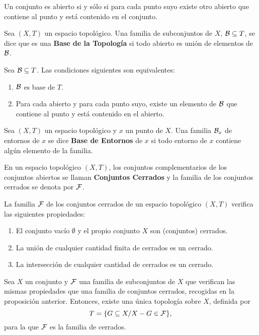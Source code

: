 \documentclass[cursovd_portada.tex]{subfiles}
\begin{document}
\begin{prop}
Un conjunto es abierto si y sólo si para cada punto suyo existe otro abierto que contiene al punto y está
contenido en el conjunto.
\end{prop}
\begin{defi}
Sea $(X,T)$ un espacio topológico. Una familia de subconjuntos de $X$, ${\cal B}\subseteq T$, se dice que es una
{\bf Base de la Topología} si todo abierto es unión de elementos de ${\cal B}$.
\end{defi}
\begin{teorema}
Sea ${\cal B}\subseteq T$. Las condiciones siguientes son equivalentes:
\begin{enumerate}
\item ${\cal B}$ es base de $T$.
\item Para cada abierto y para cada punto suyo, existe un elemento de ${\cal B}$ que contiene al punto y está
contenido en el abierto.
\end{enumerate}
\end{teorema}
\begin{defi}
Sea $(X,T)$ un espacio topológico y $x$ un punto de $X$. Una familia ${\cal B}_x$ de entornos de $x$ se dice {\bf
Base de Entornos} de $x$ si todo entorno de $x$ contiene algún elemento de la familia.
\end{defi}
\begin{defi}
En un espacio topológico $(X,T)$, los conjuntos complementarios de los conjuntos abiertos se llaman {\bf Conjuntos
Cerrados} y la familia de los conjuntos cerrados se denota por ${\cal F}$.
\end{defi}
\begin{prop}
La familia ${\cal F}$ de los conjuntos cerrados de un espacio to\-po\-ló\-gi\-co $(X,T)$ verifica las siguientes
propiedades:
\begin{enumerate}
\item El conjunto vacío $\emptyset$ y el propio conjunto $X$ son (conjuntos) cerrados.
\item La unión de cualquier cantidad finita de cerrados es un cerrado.
\item La intersección de cualquier cantidad de cerrados es un cerrado.
\end{enumerate}
\end{prop}
\begin{teorema}
Sea $X$ un conjunto y ${\cal F}$ una familia de subconjuntos de $X$ que verifican las mismas propiedades que una
familia de conjuntos cerrados, recogidas en la proposición anterior. Entonces, existe una única topología sobre
$X$, definida por
$$T=\{G\subseteq X/X-G\in{\cal F}\},$$
para la que ${\cal F}$ es la familia de cerrados.
\end{teorema}
\end{document}
